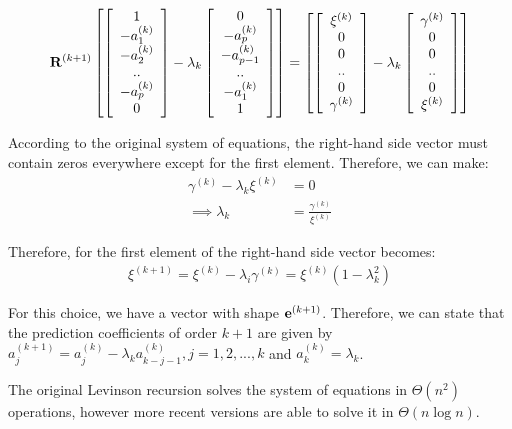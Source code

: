 \documentclass[../main.tex]{subfiles}
\begin{document}
\begin{align*}
\mathbf{R}^{(k+1)}\left[ \left[ \begin{array}{c} 1\\ -a_1^{(k)} \\ -a_2^{(k)} \\ .. \\ -a_p^{(k)} \\ 0 \end{array} \right] - \lambda_k\left[ \begin{array}{c} 0 \\ -a_p^{(k)} \\ -a_{p-1}^{(k)} \\ .. \\ -a_1^{(k)} \\ 1 \\ \end{array} \right] \right] = \left[ \left[ \begin{array}{c} \xi^{(k)} \\ 0 \\ 0 \\ .. \\ 0 \\ \gamma^{(k)} \end{array} \right] - \lambda_k\left[ \begin{array}{c} \gamma^{(k)} \\ 0 \\ 0 \\ .. \\ 0 \\ \xi^{(k)} \\ \end{array} \right] \right]
\end{align*}
\par According to the original system of equations, the right-hand side vector must contain zeros everywhere except for the first element. Therefore, we can make:
\begin{align*}
\gamma^{(k)} - \lambda_k\xi^{(k)} &= 0\\
\implies \lambda_k &= \frac{\gamma^{(k)}}{\xi^{(k)}}
\end{align*}
\par Therefore, for the first element of the right-hand side vector becomes:
\begin{align*}
\xi^{(k+1)} = \xi^{(k)} - \lambda_i\gamma^{(k)} = \xi^{(k)}(1-\lambda_k^2)
\end{align*}
\par For this choice, we have a vector with shape $\mathbf{e}^{(k+1)}$. Therefore, we can state that the prediction coefficients of order $k+1$ are given by $a_j^{(k+1)} = a_j^{(k)}-\lambda_ka_{k-j-1}^{(k)}, j = 1,2,...,k$ and  $a_k^{(k)} = \lambda_k$. 
\par The original Levinson recursion solves the system of equations in $\Theta(n^2)$ operations, however more recent versions are able to solve it in $\Theta(n\log{n})$.
\end{document}
